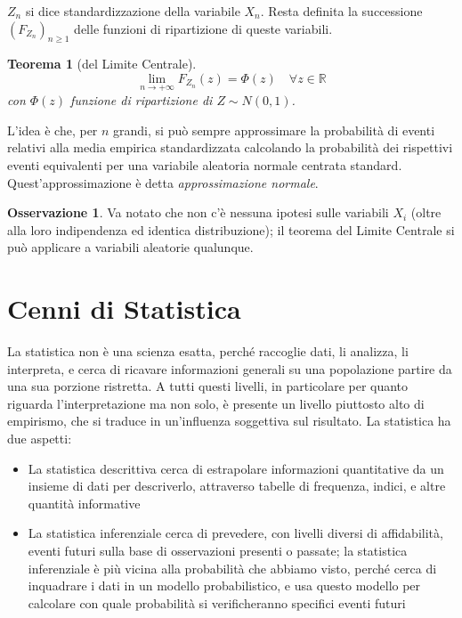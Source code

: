 \documentclass{article}
\theoremstyle{plain}
\newtheorem{teorema}{Teorema}[section]
\theoremstyle{definition}
\newtheorem{osservazione}{Osservazione}[section]
\theoremstyle{remark}
\begin{document}
$Z_n$ si dice standardizzazione della variabile $X_n$. Resta definita la successione $(F_{Z_n})_{n\geq1}$ delle funzioni di ripartizione di queste variabili.
\begin{teorema}[del Limite Centrale]
	\begin{equation*}
		\lim_{n\to+\infty}F_{Z_n}(z)=\Phi(z)\quad\forall z\in\mathds{R}
	\end{equation*}
	con $\Phi(z)$ funzione di ripartizione di $Z\sim N(0,1)$.
\end{teorema}
L'idea è che, per $n$ grandi, si può sempre approssimare la probabilità di eventi relativi alla media empirica standardizzata calcolando la probabilità dei rispettivi eventi equivalenti per una variabile aleatoria normale centrata standard. Quest'approssimazione è detta \textit{approssimazione normale}.
\begin{osservazione}
	Va notato che non c'è nessuna ipotesi sulle variabili $X_i$ (oltre alla loro indipendenza ed identica distribuzione); il teorema del Limite Centrale si può applicare a variabili aleatorie qualunque.
\end{osservazione}
\section{Cenni di Statistica} %
\label{sec:cenni_di_statistica}
La statistica non è una scienza esatta, perché raccoglie dati, li analizza, li interpreta, e cerca di ricavare informazioni generali su una popolazione  partire da una sua porzione ristretta. A tutti questi livelli, in particolare per quanto riguarda l'interpretazione ma non solo, è presente un livello piuttosto alto di empirismo, che si traduce in un'influenza soggettiva sul risultato. La statistica ha due aspetti:
\begin{itemize}
	\item La statistica descrittiva cerca di estrapolare informazioni quantitative da un insieme di dati per descriverlo, attraverso tabelle di frequenza, indici, e altre quantità informative
	\item La statistica inferenziale cerca di prevedere, con livelli diversi di affidabilità, eventi futuri sulla base di osservazioni presenti o passate; la statistica inferenziale è più vicina alla probabilità che abbiamo visto, perché cerca di inquadrare i dati in un modello probabilistico, e usa questo modello per calcolare con quale probabilità si verificheranno specifici eventi futuri
\end{itemize}
\end{document}
